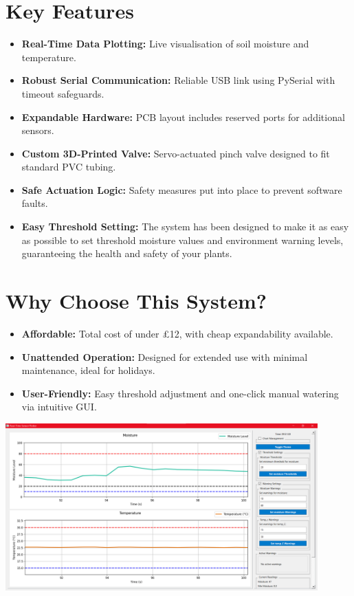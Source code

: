 \documentclass[a4paper,11pt]{article}
\begin{document}
\vspace{1em}

\section*{Key Features}
\begin{itemize}[leftmargin=1.5em]
    \item \textbf{Real-Time Data Plotting:} 
    Live visualisation of soil moisture and temperature.
    \item \textbf{Robust Serial Communication:} 
    Reliable USB link using PySerial with timeout safeguards.
    \item \textbf{Expandable Hardware:} 
    PCB layout includes reserved ports for additional sensors.
    \item \textbf{Custom 3D-Printed Valve:} 
    Servo-actuated pinch valve designed to fit standard PVC tubing.
    \item \textbf{Safe Actuation Logic:} 
    Safety measures put into place to prevent software faults.
    \item \textbf{Easy Threshold Setting:}
    The system has been designed to make it as easy as possible 
    to set threshold moisture values and environment warning levels,
    guaranteeing the health and safety of your plants.
\end{itemize}

\section*{Why Choose This System?}
\begin{itemize}[leftmargin=1.5em]
    \item \textbf{Affordable:} 
    Total cost of under £12, with cheap expandability available.
    \item \textbf{Unattended Operation:} Designed for extended use with 
    minimal maintenance, ideal for holidays.
    \item \textbf{User-Friendly:} Easy threshold adjustment and 
    one-click manual watering via intuitive GUI.
\end{itemize}

\vspace{1em}

\begin{center}
    \includegraphics[width=0.9\textwidth]{Images/3 - Threshold Setting.png}
\end{center}
\end{document}
